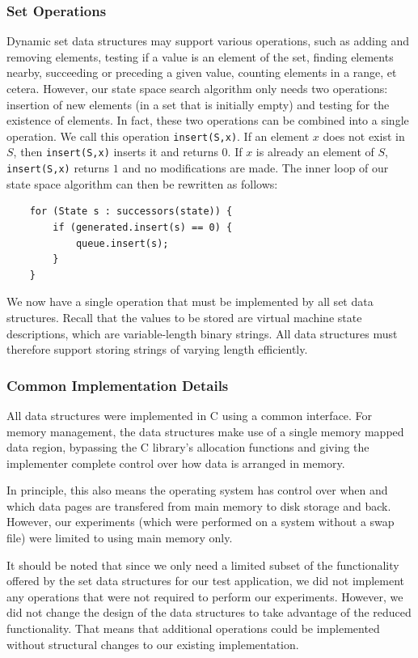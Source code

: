 \documentclass{acm_proc_article-sp}
\begin{document}
\subsubsection{Set Operations}
Dynamic set data structures may support various operations, such as adding and removing elements, testing if a value is an element of the set, finding elements nearby, succeeding or preceding a given value, counting elements in a range, et cetera. However, our state space search algorithm only needs two operations: insertion of new elements (in a set that is initially empty) and testing for the existence of elements. In fact, these two operations can be combined into a single operation. We call this operation \verb#insert(S,x)#. If an element $x$ does not exist in $S$, then \verb#insert(S,x)# inserts it and returns $0$. If $x$ is already an element of $S$, \verb#insert(S,x)# returns $1$ and no modifications are made. The inner loop of our state space algorithm can then be rewritten as follows:
\begin{verbatim}
    for (State s : successors(state)) {
        if (generated.insert(s) == 0) {
            queue.insert(s);
        }
    }
\end{verbatim}

We now have a single operation that must be implemented by all set data structures. Recall that the values to be stored are virtual machine state descriptions, which are variable-length binary strings. All data structures must therefore support storing strings of varying length efficiently.

\subsubsection{Common Implementation Details}
All data structures were implemented in C using a common interface.
For memory management, the data structures make use of a single memory mapped
data region, bypassing the C library's allocation functions and giving the
implementer complete control over how data is arranged in memory.

In principle, this also means the operating system has control over when and
which data pages are transfered from main memory to disk storage and back.
However, our experiments (which were performed on a system without a swap file)
were limited to using main memory only.

It should be noted that since we only need a limited subset of the functionality
offered by the set data structures for our test application, we did not
implement any operations that were not required to perform our experiments.
However, we did not change the design of the data structures to take advantage
of the reduced functionality. That means that additional operations could be
implemented without structural changes to our existing implementation.
\end{document}
